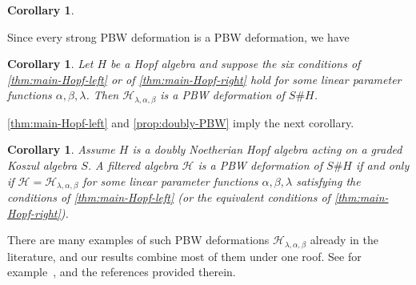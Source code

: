 \documentclass[11pt]{amsart}
\numberwithin{equation}{section}
\newtheorem{cor}[equation]{Corollary}
\newcommand{\chabl}{\cH_{\lambda,\alpha,\beta}}
\renewcommand{\_}[1]{\mbox{$_{\left( #1 \right)}$}}
\newcommand{\Ho}{H}%
\newcommand{\cH}{\mathcal{H}}
\begin{document}
{\begin{cor}
  \end{cor}


  Since every strong PBW deformation is a PBW deformation, we have
\begin{cor}\label{6ConditionsImplyWeakPBW}
  Let $H$ be a Hopf algebra and
suppose the six  conditions of \cref{thm:main-Hopf-left} or of 
\cref{thm:main-Hopf-right}
hold for some linear parameter functions 
$\alpha,\beta,\lambda$. 
Then $\chabl$ is a PBW deformation of $S\# \Ho$. 
\end{cor}


\cref{thm:main-Hopf-left} and \cref{prop:doubly-PBW} imply the next corollary.
\begin{cor}\label{6ConditionsDoublyNoetherianCase}
  Assume $H$ is a doubly Noetherian Hopf algebra
  acting on a graded Koszul algebra $S$.
A filtered algebra $\cH$ is a PBW deformation of $S\# \Ho$ if
and only if $\cH= \chabl$ for some
linear parameter functions 
$\alpha,\beta,\lambda$ satisfying
the conditions of
\cref{thm:main-Hopf-left}
(or the equivalent conditions of \cref{thm:main-Hopf-right}).
\end{cor}





There are many examples 
of such PBW deformations $\chabl$
already in the literature,
and our results combine most of them under one roof. 
See for example~\cite{FlakeSahi,SW-Koszul,WW}, 
and the references provided therein. 


\vspace{2ex}

}
\end{document}

